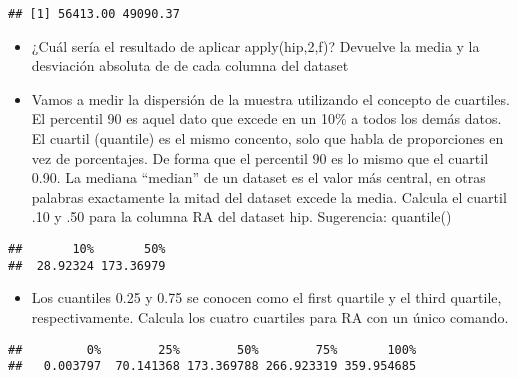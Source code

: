 \documentclass[]{article}
\newenvironment{Shaded}{\begin{snugshade}}{\end{snugshade}}
\newcommand{\KeywordTok}[1]{\textcolor[rgb]{0.13,0.29,0.53}{\textbf{#1}}}
\newcommand{\DataTypeTok}[1]{\textcolor[rgb]{0.13,0.29,0.53}{#1}}
\newcommand{\DecValTok}[1]{\textcolor[rgb]{0.00,0.00,0.81}{#1}}
\newcommand{\OperatorTok}[1]{\textcolor[rgb]{0.81,0.36,0.00}{\textbf{#1}}}
\newcommand{\NormalTok}[1]{#1}
\providecommand{\tightlist}{%
  \setlength{\itemsep}{0pt}\setlength{\parskip}{0pt}}
\begin{document}
\begin{verbatim}
## [1] 56413.00 49090.37
\end{verbatim}

\begin{itemize}
\item
  ¿Cuál sería el resultado de aplicar apply(hip,2,f)? Devuelve la media
  y la desviación absoluta de de cada columna del dataset
\item
  Vamos a medir la dispersión de la muestra utilizando el concepto de
  cuartiles. El percentil 90 es aquel dato que excede en un 10\% a todos
  los demás datos. El cuartil (quantile) es el mismo concento, solo que
  habla de proporciones en vez de porcentajes. De forma que el percentil
  90 es lo mismo que el cuartil 0.90. La mediana ``median'' de un
  dataset es el valor más central, en otras palabras exactamente la
  mitad del dataset excede la media. Calcula el cuartil .10 y .50 para
  la columna RA del dataset hip. Sugerencia: quantile()
\end{itemize}

\begin{Shaded}
\end{Shaded}

\begin{verbatim}
##       10%       50% 
##  28.92324 173.36979
\end{verbatim}

\begin{itemize}
\tightlist
\item
  Los cuantiles 0.25 y 0.75 se conocen como el first quartile y el third
  quartile, respectivamente. Calcula los cuatro cuartiles para RA con un
  único comando.
\end{itemize}

\begin{Shaded}
\end{Shaded}

\begin{verbatim}
##         0%        25%        50%        75%       100% 
##   0.003797  70.141368 173.369788 266.923319 359.954685
\end{verbatim}
\end{document}
